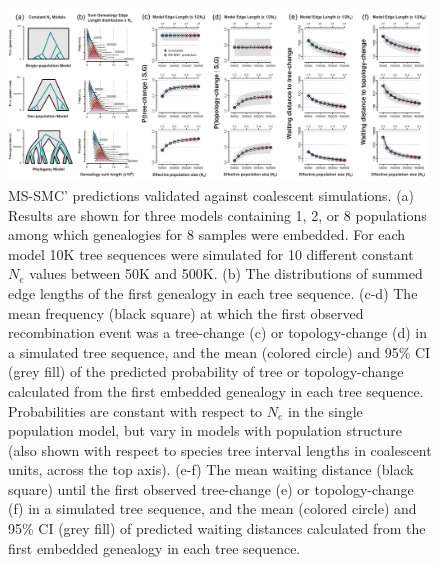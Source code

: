 \documentclass[11pt]{article}
\begin{document}
\begin{figure}[t]
	\centering
	\includegraphics[width=0.99\textwidth]{figures/Fig4-final-validation4.pdf}
	\caption{
		MS-SMC' predictions validated against coalescent simulations. 
		(a) Results are shown for three models containing 1, 2, or 8 
		populations among which genealogies for 8 samples were embedded. 
		For each model 10K tree sequences were simulated for 10 different
		constant $N_e$ values between 50K and 500K. 
		(b) The distributions of summed edge lengths of the first genealogy in 
		each tree sequence. 
		(c-d) The mean frequency (black square) at which the first observed 
		recombination event was a tree-change (c) or topology-change (d) in a 
		simulated tree sequence, and the mean (colored circle) and 95\% CI 
		(grey fill) of the predicted probability of tree or topology-change 
		calculated from the first embedded genealogy in each tree sequence. 
		Probabilities are constant with respect to $N_e$ in the single population
		model, but vary in models with population structure
		(also shown with respect to species tree interval lengths in 
		coalescent units, across the top axis).
		(e-f) The mean waiting distance (black square) until the first observed 
		tree-change (e) or topology-change (f) in a simulated tree sequence, and the mean 
		(colored circle) and 95\% CI (grey fill) of predicted waiting distances calculated
		from the first embedded genealogy in each tree sequence.
	}
	\label{fig:fig-validation}
\end{figure}
\end{document}
